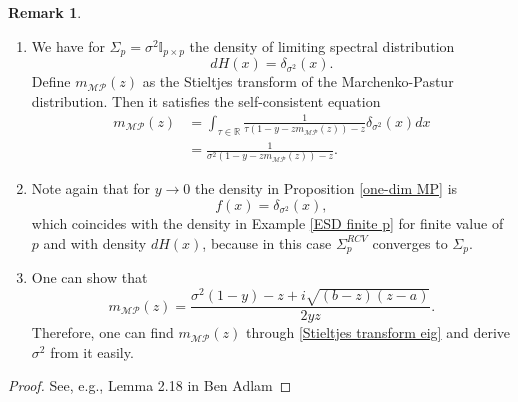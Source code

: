 \documentclass[a4paper,11pt]{book}
\theoremstyle{plain}
\theoremstyle{definition}
\newtheorem{rmrk}[thm]{Remark}
\newcommand{\MR}{\mathbb{R}}
\begin{document}
	\begin{rmrk} \
		\begin{enumerate}
			\item We have for $\Sigma_p = \sigma^2 \mathbb{I}_{p \times p}$ the density of limiting spectral distribution
			\[ dH(x) = \delta_{\sigma^2}(x). \]
			Define $m_{\mathcal{MP}}(z)$ as the Stieltjes transform of the Marchenko-Pastur distribution. Then it satisfies the self-consistent equation
			\[
			\begin{aligned}
			m_{\mathcal{MP}}(z) & = \int_{\tau \in \MR} \frac{1}{ \tau( 1-y-zm_{\mathcal{MP}}(z))-z} \delta_{\sigma^2}(x) dx \\
			& =  \frac{1}{ \sigma^2( 1-y-zm_{\mathcal{MP}}(z))-z}.
			\end{aligned}
			\]
			\item Note again that for $y \rightarrow 0$ the density in Proposition \ref{one-dim MP} is
			\[f(x) = \delta_{\sigma^2}(x), \]
			which coincides with the density in Example \ref{ESD finite p} for finite value of $p$ and with density $dH(x)$, because in this case $\Sigma_p^{RCV}$ converges to $\Sigma_p$.
			\item One can show that
			\[ m_{\mathcal{MP}}(z) = \frac{\sigma^2(1-y)-z+ i \sqrt{(b-z)(z-a)}}{2yz}. \]
			Therefore, one can find $m_{\mathcal{MP}}(z)$ through \eqref{Stieltjes transform eig} and derive $\sigma^2$ from it easily.
		\end{enumerate}
		\begin{proof}
			See, e.g., Lemma 2.18 in Ben Adlam
		\end{proof}
	\end{rmrk}
	
\end{document}
